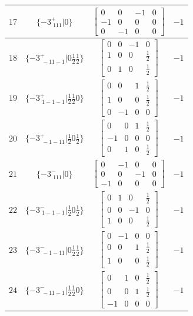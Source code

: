 \documentclass[fleqn,8pt]{jsarticle}
\begin{document}
\begin{longtable}{cccc}
$ 17 $ & $ \{-3^{+}_{\,\,111}|0\} $ & $ \begin{bmatrix} 0 & 0 & -1 & 0 \\ -1 & 0 & 0 & 0 \\ 0 & -1 & 0 & 0 \end{bmatrix} $ & $ -1 $ \\ \hline
$ 18 $ & $ \{-3^{+}_{\,\,-11-1}|0 \frac{1}{2} \frac{1}{2}\} $ & $ \begin{bmatrix} 0 & 0 & -1 & 0 \\ 1 & 0 & 0 & \frac{1}{2} \\ 0 & 1 & 0 & \frac{1}{2} \end{bmatrix} $ & $ -1 $ \\ \hline
$ 19 $ & $ \{-3^{+}_{\,\,1-1-1}|\frac{1}{2} \frac{1}{2} 0\} $ & $ \begin{bmatrix} 0 & 0 & 1 & \frac{1}{2} \\ 1 & 0 & 0 & \frac{1}{2} \\ 0 & -1 & 0 & 0 \end{bmatrix} $ & $ -1 $ \\ \hline
$ 20 $ & $ \{-3^{+}_{\,\,-1-11}|\frac{1}{2} 0 \frac{1}{2}\} $ & $ \begin{bmatrix} 0 & 0 & 1 & \frac{1}{2} \\ -1 & 0 & 0 & 0 \\ 0 & 1 & 0 & \frac{1}{2} \end{bmatrix} $ & $ -1 $ \\ \hline
$ 21 $ & $ \{-3^{-}_{\,\,111}|0\} $ & $ \begin{bmatrix} 0 & -1 & 0 & 0 \\ 0 & 0 & -1 & 0 \\ -1 & 0 & 0 & 0 \end{bmatrix} $ & $ -1 $ \\ \hline
$ 22 $ & $ \{-3^{-}_{\,\,1-1-1}|\frac{1}{2} 0 \frac{1}{2}\} $ & $ \begin{bmatrix} 0 & 1 & 0 & \frac{1}{2} \\ 0 & 0 & -1 & 0 \\ 1 & 0 & 0 & \frac{1}{2} \end{bmatrix} $ & $ -1 $ \\ \hline
$ 23 $ & $ \{-3^{-}_{\,\,-1-11}|0 \frac{1}{2} \frac{1}{2}\} $ & $ \begin{bmatrix} 0 & -1 & 0 & 0 \\ 0 & 0 & 1 & \frac{1}{2} \\ 1 & 0 & 0 & \frac{1}{2} \end{bmatrix} $ & $ -1 $ \\ \hline
$ 24 $ & $ \{-3^{-}_{\,\,-11-1}|\frac{1}{2} \frac{1}{2} 0\} $ & $ \begin{bmatrix} 0 & 1 & 0 & \frac{1}{2} \\ 0 & 0 & 1 & \frac{1}{2} \\ -1 & 0 & 0 & 0 \end{bmatrix} $ & $ -1 $ \\
\end{longtable}
\end{document}
